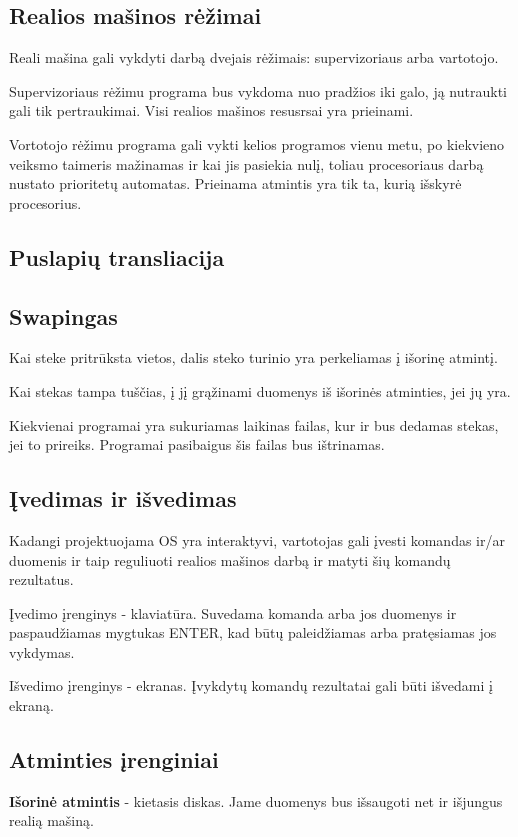 	\subsection{Realios mašinos rėžimai}
	Reali mašina gali vykdyti darbą dvejais rėžimais: supervizoriaus arba vartotojo. 
	
	Supervizoriaus rėžimu programa bus vykdoma nuo pradžios iki galo, ją nutraukti gali tik pertraukimai. Visi realios mašinos resusrsai yra prieinami.
	
	Vortotojo rėžimu programa gali vykti kelios programos vienu metu, po kiekvieno veiksmo taimeris mažinamas ir kai jis pasiekia nulį, toliau procesoriaus darbą nustato prioritetų automatas. Prieinama atmintis yra tik ta, kurią išskyrė procesorius.
	
	\subsection{Puslapių transliacija}
	
	\subsection{Swapingas}
	Kai steke pritrūksta vietos, dalis steko turinio yra perkeliamas į išorinę atmintį.
	
	Kai stekas tampa tuščias, į jį grąžinami duomenys iš išorinės atminties, jei jų yra.
	
	Kiekvienai programai yra sukuriamas laikinas failas, kur ir bus dedamas stekas, jei to prireiks. Programai pasibaigus šis failas bus ištrinamas.
	
	\subsection{Įvedimas ir išvedimas}
	Kadangi projektuojama OS yra interaktyvi, vartotojas gali įvesti komandas ir/ar duomenis ir taip reguliuoti realios mašinos darbą ir matyti šių komandų rezultatus.
	
	Įvedimo įrenginys - klaviatūra. Suvedama komanda arba jos duomenys ir paspaudžiamas mygtukas ENTER, kad būtų paleidžiamas arba pratęsiamas jos vykdymas.
	
	Išvedimo įrenginys - ekranas. Įvykdytų komandų rezultatai gali būti išvedami į ekraną.
	
	\subsection{Atminties įrenginiai}
	\textbf{Išorinė atmintis} - kietasis diskas. Jame duomenys bus išsaugoti net ir išjungus realią mašiną.
	
